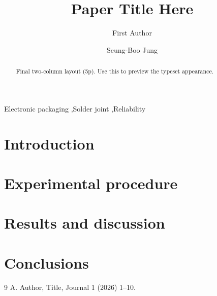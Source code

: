 \documentclass[final,5p,times,twocolumn]{elsarticle}
\begin{document}
\begin{frontmatter}

\title{Paper Title Here}

\author[skku]{First Author}
\author[skku]{Seung-Boo Jung}

\begin{abstract}
Final two-column layout (5p). Use this to preview the typeset appearance.
\end{abstract}

\begin{keyword}
Electronic packaging \sep Solder joint \sep Reliability
\end{keyword}

\end{frontmatter}

\section{Introduction}

\section{Experimental procedure}

\section{Results and discussion}

\section{Conclusions}

\begin{thebibliography}{9}
 A. Author, Title, Journal 1 (2026) 1--10.
\end{thebibliography}
\end{document}

